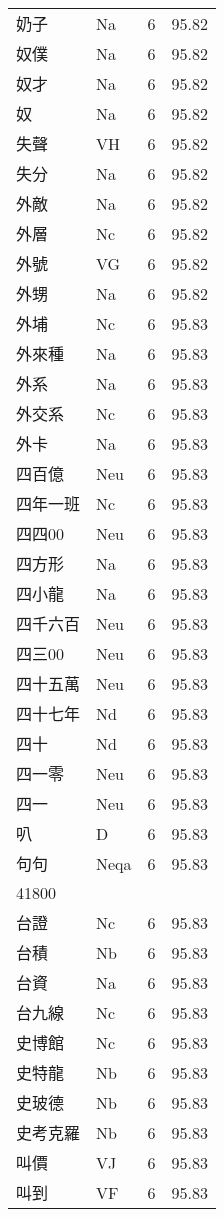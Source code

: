 \documentclass[twocolumn]{book}
\begin{document}
\begin{supertabular}{llrr}
奶子 & Na & 6 &  95.82\\
奴僕 & Na & 6 &  95.82\\
奴才 & Na & 6 &  95.82\\
奴 & Na & 6 &  95.82\\
失聲 & VH & 6 &  95.82\\
失分 & Na & 6 &  95.82\\
外敵 & Na & 6 &  95.82\\
外層 & Nc & 6 &  95.82\\
外號 & VG & 6 &  95.82\\
外甥 & Na & 6 &  95.82\\
外埔 & Nc & 6 &  95.83\\
外來種 & Na & 6 &  95.83\\
外系 & Na & 6 &  95.83\\
外交系 & Nc & 6 &  95.83\\
外卡 & Na & 6 &  95.83\\
四百億 & Neu & 6 &  95.83\\
四年一班 & Nc & 6 &  95.83\\
四四00 & Neu & 6 &  95.83\\
四方形 & Na & 6 &  95.83\\
四小龍 & Na & 6 &  95.83\\
四千六百 & Neu & 6 &  95.83\\
四三00 & Neu & 6 &  95.83\\
四十五萬 & Neu & 6 &  95.83\\
四十七年 & Nd & 6 &  95.83\\
四十 & Nd & 6 &  95.83\\
四一零 & Neu & 6 &  95.83\\
四一 & Neu & 6 &  95.83\\
叭 & D & 6 &  95.83\\
句句 & Neqa & 6 &  95.83\\
41800\\
台證 & Nc & 6 &  95.83\\
台積 & Nb & 6 &  95.83\\
台資 & Na & 6 &  95.83\\
台九線 & Nc & 6 &  95.83\\
史博館 & Nc & 6 &  95.83\\
史特龍 & Nb & 6 &  95.83\\
史玻德 & Nb & 6 &  95.83\\
史考克羅 & Nb & 6 &  95.83\\
叫價 & VJ & 6 &  95.83\\
叫到 & VF & 6 &  95.83\\

\end{supertabular}
\end{document}
